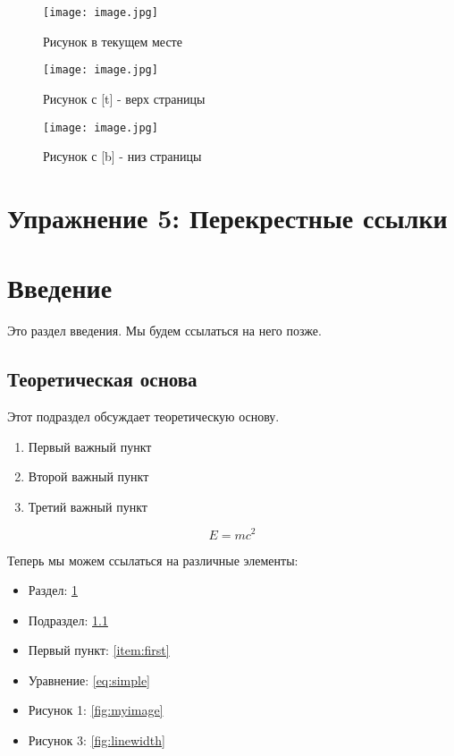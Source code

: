 \documentclass{article}
\begin{document}
\lipsum[3]

\begin{figure}[H]
\centering
\texttt{[image: image.jpg]}
\caption{Рисунок в текущем месте}
\label{fig:current}
\end{figure}

\lipsum[4]

\begin{figure}[t]
\centering
\texttt{[image: image.jpg]}
\caption{Рисунок с [t] - верх страницы}
\label{fig:top}
\end{figure}

\begin{figure}[b]
\centering
\texttt{[image: image.jpg]}
\caption{Рисунок с [b] - низ страницы}
\label{fig:bottom}
\end{figure}

\clearpage

\section*{Упражнение 5: Перекрестные ссылки}

\section{Введение}
\label{sec:intro}

Это раздел введения. Мы будем ссылаться на него позже.

\subsection{Теоретическая основа}
\label{subsec:background}

Этот подраздел обсуждает теоретическую основу.

\begin{enumerate}
    \item \label{item:first} Первый важный пункт
    \item \label{item:second} Второй важный пункт
    \item \label{item:third} Третий важный пункт
\end{enumerate}

\begin{equation}
\label{eq:simple}
E = mc^2
\end{equation}

Теперь мы можем ссылаться на различные элементы:

\begin{itemize}
    \item Раздел: \ref{sec:intro}
    \item Подраздел: \ref{subsec:background}
    \item Первый пункт: \ref{item:first}
    \item Уравнение: \ref{eq:simple}
    \item Рисунок 1: \ref{fig:myimage}
    \item Рисунок 3: \ref{fig:linewidth}
\end{itemize}
\end{document}
